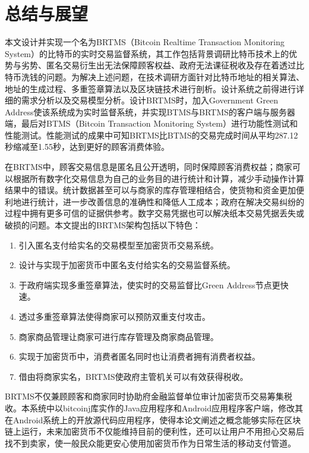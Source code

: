    
\chapter{总结与展望}
本文设计并实现一个名为BRTMS（Bitcoin Realtime Transaction Monitoring System）的比特币的实时交易监督系统，其工作包括背景调研比特币技术上的优势与劣势、匿名交易衍生出无法保障顾客权益、政府无法课征税收及存在着透过比特币洗钱的问题。为解决上述问题，在技术调研方面针对比特币地址的相关算法、地址的生成过程、多重签章算法以及区块链技术进行剖析。设计系统之前得进行详细的需求分析以及交易模型分析。设计BRTMS时，加入Government Green Address使该系统成为实时监督系统，并实现BTMS与BRTMS的客户端与服务器端，最后对BTMS（Bitcoin Transaction Monitoring System）进行功能性测试和性能测试。性能测试的成果中可知BRTMS比BTMS的交易完成时间从平均287.12秒缩减至1.55秒，达到更好的顾客消费体验。

在BRTMS中，顾客交易信息是匿名且公开透明，同时保障顾客消费权益；商家可以根据所有数字化交易信息为自己的业务目的进行统计和计算，减少手动操作计算结果中的错误。统计数据甚至可以与商家的库存管理相结合，使货物和资金更加便利地进行统计，进一步改善信息的准确性和降低人工成本；政府在解决交易纠纷的过程中拥有更多可信的证据供参考。数字交易凭据也可以解决纸本交易凭据丢失或破损的问题。本文提出的BRTMS架构包括以下特色：
		\begin{enumerate}
			\item 引入匿名支付给实名的交易模型至加密货币交易系统。
			\item 设计与实现于加密货币中匿名支付给实名的交易监督系统。
			\item 于政府端实现多重签章算法，使实时的交易监督比Green Address节点更快速。
			\item 透过多重签章算法使得商家可以预防双重支付攻击。
			\item 商家商品管理让商家可进行库存管理及商家商品管理。
			\item 实现于加密货币中，消费者匿名同时也让消费者拥有消费者权益。
			\item 借由将商家实名，BRTMS使政府主管机关可以有效获得税收。
		\end{enumerate}



		
BRTMS不仅兼顾顾客和商家同时协助府金融监督单位审计加密货币交易筹集税收。本系统中以bitcoinj库实作的Java应用程序和Android应用程序客户端，修改其在Android系统上的开放源代码应用程序，使得本论文阐述之概念能够实际在区块链上运行，未来加密货币不仅能维持目前的便利性，还可以让用户不用担心交易后找不到卖家，使一般民众能更安心使用加密货币作为日常生活的移动支付管道。
